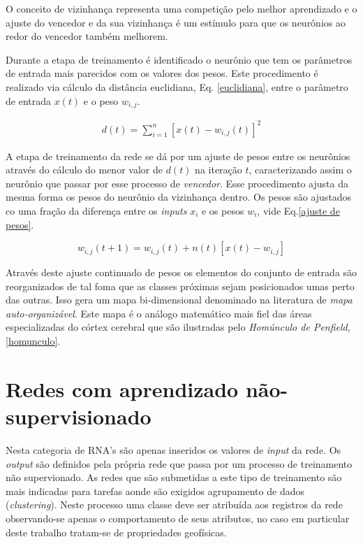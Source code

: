 O conceito de vizinhança representa uma competição pelo melhor aprendizado e o ajuste do vencedor e da sua vizinhança é um estímulo para que os neurônios ao redor do vencedor também melhorem.

Durante a etapa de treinamento é identificado o neurônio que tem os parâmetros de entrada mais parecidos com os valores dos pesos. Este procedimento é realizado via cálculo da distância euclidiana, Eq. \ref{euclidiana}, entre o parâmetro de entrada $x(t)$ e o peso $w_{i,j}$.

\begin{eqnarray}
d(t)= \sum^{n}_{i=1}[x(t)-w_{i,j}(t)]^{2}
\label{euclidiana}
\end{eqnarray}

A etapa de treinamento da rede se dá por um ajuste de pesos entre os neurônios através do cálculo do menor valor de $d(t)$ na iteração $t$, caracterizando assim o neurônio que passar por esse processo de \textit{vencedor}. Esse procedimento ajusta da mesma forma os pesos do neurônio da vizinhança dentro. Os pesos são ajustados co uma fração da diferença entre os \textit{inputs} $x_{i}$ e os pesos $w_{i}$, vide Eq.\ref{ajuste de pesos}.

\begin{equation}
w_{i,j}(t+1)=w_{i,j}(t)+n(t)[x(t)-w_{i,j}]
\label{ajuste de pesos}
\end{equation}

Através deste ajuste continuado de pesos os elementos do conjunto de entrada são reorganizados de tal foma que as classes próximas sejam posicionados umas perto das outras. Isso gera um mapa bi-dimensional denominado na literatura de \textit{mapa auto-organizável}. Este mapa é o análogo matemático mais fiel das áreas especializadas do córtex cerebral que são ilustradas pelo \textit{Homúnculo de Penfield}, \ref{homunculo}.

\section{Redes com aprendizado não-supervisionado}

Nesta categoria de RNA's são apenas inseridos os valores de \textit{input} da rede. Os \textit{output} são definidos pela própria rede que passa por um processo de treinamento não supervionado. As redes que são submetidas a este tipo de treinamento são mais indicadas para tarefas aonde são exigidos agrupamento de dados (\textit{clustering}). Neste processo uma classe deve ser atribuída aos registros da rede observando-se apenas o comportamento de seus atributos, no caso em particular deste trabalho tratam-se de propriedades geofísicas.

